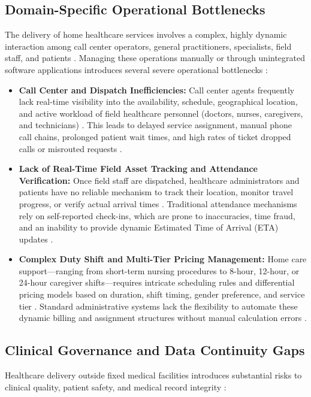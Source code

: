 \documentclass[lettersize,onecolumn,journal]{IEEEtran}
\begin{document}
	\subsection{Domain-Specific Operational Bottlenecks}
	The delivery of home healthcare services involves a complex, highly dynamic interaction among call center operators, general practitioners, specialists, field staff, and patients \cite{srs2026}. Managing these operations manually or through unintegrated software applications introduces several severe operational bottlenecks \cite{srs2026}:
	
	\begin{itemize}
		\item \textbf{Call Center and Dispatch Inefficiencies:} Call center agents frequently lack real-time visibility into the availability, schedule, geographical location, and active workload of field healthcare personnel (doctors, nurses, caregivers, and technicians) \cite{srs2026}. This leads to delayed service assignment, manual phone call chains, prolonged patient wait times, and high rates of ticket dropped calls or misrouted requests \cite{srs2026}.
		\item \textbf{Lack of Real-Time Field Asset Tracking and Attendance Verification:} Once field staff are dispatched, healthcare administrators and patients have no reliable mechanism to track their location, monitor travel progress, or verify actual arrival times \cite{zandbergen2009accuracy}. Traditional attendance mechanisms rely on self-reported check-ins, which are prone to inaccuracies, time fraud, and an inability to provide dynamic Estimated Time of Arrival (ETA) updates \cite{zandbergen2009accuracy}.
		\item \textbf{Complex Duty Shift and Multi-Tier Pricing Management:} Home care support—ranging from short-term nursing procedures to 8-hour, 12-hour, or 24-hour caregiver shifts—requires intricate scheduling rules and differential pricing models based on duration, shift timing, gender preference, and service tier \cite{srs2026}. Standard administrative systems lack the flexibility to automate these dynamic billing and assignment structures without manual calculation errors \cite{srs2026}.
	\end{itemize}
	
	\subsection{Clinical Governance and Data Continuity Gaps}
	Healthcare delivery outside fixed medical facilities introduces substantial risks to clinical quality, patient safety, and medical record integrity \cite{telemedicine_homecare}:
	
\end{document}
